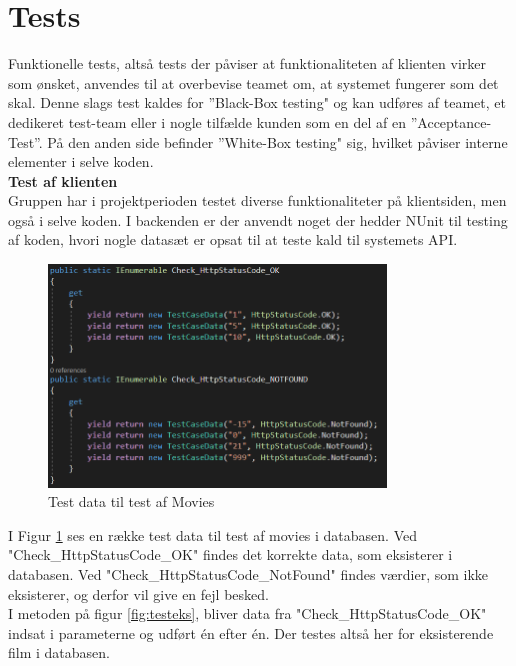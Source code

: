 \section{Tests}\label{sec:tests}
Funktionelle tests, altså tests der påviser at funktionaliteten af klienten virker som ønsket, 
anvendes til at overbevise teamet om, at systemet fungerer som det skal. 
Denne slags test kaldes for ”Black-Box testing" og kan udføres af teamet, 
et dedikeret test-team eller i nogle tilfælde kunden som en del af en ”Acceptance-Test”. 
På den anden side befinder ”White-Box testing" sig, hvilket påviser interne elementer i selve koden. \\

\textbf{Test af klienten} \\
Gruppen har i projektperioden testet diverse funktionaliteter på klientsiden, 
men også i selve koden. I backenden er der anvendt noget der hedder NUnit til testing af koden, 
hvori nogle datasæt er opsat til at teste kald til systemets API.\\

\begin{figure}[H]
    \centering
    \includegraphics[width=0.8\textwidth]{figures/testmoviedata.PNG}
    \caption{Test data til test af Movies}
    \label{fig:testdata}
\end{figure}

I Figur \ref{fig:testdata} ses en række test data til test af movies i databasen. Ved "Check\_HttpStatusCode\_OK" findes det korrekte data,
som eksisterer i databasen. Ved "Check\_HttpStatusCode\_NotFound" findes værdier, som ikke eksisterer, og derfor vil give
en fejl besked. \\

I metoden på figur \ref{fig:testeks}, bliver data fra "Check\_HttpStatusCode\_OK" indsat i parameterne
og udført én efter én. Der testes altså her for eksisterende film i databasen. 


